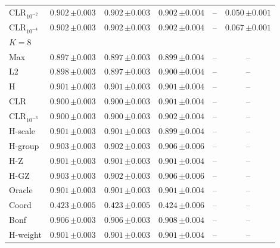 \begin{tabular}{lccccc}
CLR$_{10^{-2}}$ & $0.902\,{\scriptstyle\pm 0.003}$ & $0.902\,{\scriptstyle\pm 0.003}$ & $0.902\,{\scriptstyle\pm 0.004}$ & -- & $0.050\,{\scriptstyle\pm 0.001}$ \\
CLR$_{10^{-4}}$ & $0.902\,{\scriptstyle\pm 0.003}$ & $0.902\,{\scriptstyle\pm 0.003}$ & $0.902\,{\scriptstyle\pm 0.004}$ & -- & $0.067\,{\scriptstyle\pm 0.001}$ \\
\midrule
\multicolumn{6}{l}{$K=8$} \\
Max & $0.897\,{\scriptstyle\pm 0.003}$ & $0.897\,{\scriptstyle\pm 0.003}$ & $0.899\,{\scriptstyle\pm 0.004}$ & -- & -- \\
L2 & $0.898\,{\scriptstyle\pm 0.003}$ & $0.897\,{\scriptstyle\pm 0.003}$ & $0.900\,{\scriptstyle\pm 0.004}$ & -- & -- \\
H & $0.901\,{\scriptstyle\pm 0.003}$ & $0.901\,{\scriptstyle\pm 0.003}$ & $0.901\,{\scriptstyle\pm 0.004}$ & -- & -- \\
CLR & $0.900\,{\scriptstyle\pm 0.003}$ & $0.900\,{\scriptstyle\pm 0.003}$ & $0.901\,{\scriptstyle\pm 0.004}$ & -- & -- \\
CLR$_{10^{-3}}$ & $0.900\,{\scriptstyle\pm 0.003}$ & $0.900\,{\scriptstyle\pm 0.003}$ & $0.902\,{\scriptstyle\pm 0.004}$ & -- & -- \\
H-scale & $0.901\,{\scriptstyle\pm 0.003}$ & $0.901\,{\scriptstyle\pm 0.003}$ & $0.899\,{\scriptstyle\pm 0.004}$ & -- & -- \\
H-group & $0.903\,{\scriptstyle\pm 0.003}$ & $0.902\,{\scriptstyle\pm 0.003}$ & $0.906\,{\scriptstyle\pm 0.006}$ & -- & -- \\
H-Z & $0.901\,{\scriptstyle\pm 0.003}$ & $0.901\,{\scriptstyle\pm 0.003}$ & $0.901\,{\scriptstyle\pm 0.004}$ & -- & -- \\
H-GZ & $0.903\,{\scriptstyle\pm 0.003}$ & $0.902\,{\scriptstyle\pm 0.003}$ & $0.906\,{\scriptstyle\pm 0.006}$ & -- & -- \\
Oracle & $0.901\,{\scriptstyle\pm 0.003}$ & $0.901\,{\scriptstyle\pm 0.003}$ & $0.901\,{\scriptstyle\pm 0.004}$ & -- & -- \\
Coord & $0.423\,{\scriptstyle\pm 0.005}$ & $0.423\,{\scriptstyle\pm 0.005}$ & $0.424\,{\scriptstyle\pm 0.006}$ & -- & -- \\
Bonf & $0.906\,{\scriptstyle\pm 0.003}$ & $0.906\,{\scriptstyle\pm 0.003}$ & $0.908\,{\scriptstyle\pm 0.004}$ & -- & -- \\
H-weight & $0.901\,{\scriptstyle\pm 0.003}$ & $0.901\,{\scriptstyle\pm 0.003}$ & $0.901\,{\scriptstyle\pm 0.004}$ & -- & -- \\

\end{tabular}
